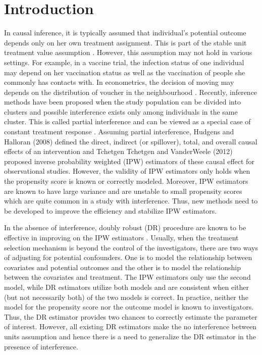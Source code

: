 \documentclass[oupdraft]{bio}
\begin{document}
\newpage
\section{Introduction}
\vspace{-0.2cm}
In causal inference, it is typically assumed that individual's potential outcome depends only on her own treatment assignment. This is part of the stable unit treatment value assumption \citep{rubin1980randomization}. However, this assumption may not hold in various settings. For example, in a vaccine trial, the infection status of one individual may depend on her vaccination status as well as the vaccination of people she commonly has contacts with. In econometrics, the decision of moving may depends on the distribution of voucher in the neighbourhood \citep{sobel2006randomized}. Recently, inference methods have been proposed when the study population can be divided into clusters and possible interference exists only among individuals in the same cluster. This is called partial interference \citep{sobel2006randomized} and can be viewed as a special case of constant treatment response \citep{manski2013identification}. Assuming partial interference, Hudgens and Halloran (2008) defined the direct, indirect
(or spillover), total, and overall causal effects of an intervention and Tchetgen Tchetgen and VanderWeele (2012) proposed inverse probability weighted (IPW) estimators of these causal effect for observational studies. However, the validity of IPW estimators only holds when the propensity score is known or correctly modeled. Moreover, IPW estimators are known to have large variance and are unstable to small propensity scores which are quite common in a study with interference. Thus, new methods need to be developed to improve the efficiency and stabilize IPW estimators.


In the absence of interference, doubly robust (DR) procedure are known to be effective in improving on the IPW estimators \citep{lunceford2004stratification}. Usually, when the treatment selection mechanism is beyond the control of the investigators, there are two ways of adjusting for potential confounders. One is to model the relationship between covariates and potential outcomes and the other is to model the relationship between the covariates and treatment. The IPW estimators only use the second model, while DR estimators utilize both models and are consistent when either (but not necessarily both) of the two models is correct. In practice, neither the model for the propensity score nor the outcome model is known to investigators. Thus, the DR estimator provides two chances to correctly estimate the parameter of interest. However, all existing DR estimators make the no interference between units assumption and hence there is a need to generalize the DR estimator in the presence of interference.
\end{document}
